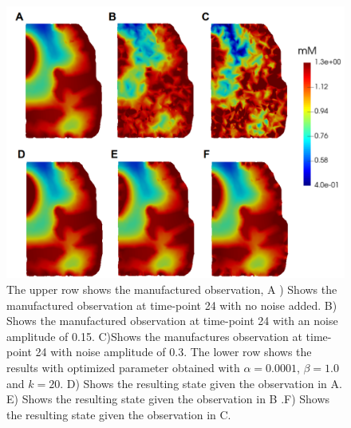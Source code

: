 \documentclass[11pt,a4paper]{article}
\begin{document}
\begin{figure}
\centering
\includegraphics[scale=0.4]{noise-12.png}  
\caption{The upper row shows the manufactured observation, A ) Shows the manufactured observation at time-point 24 with no noise added. B) Shows the manufactured observation at time-point 24 with an noise amplitude of 0.15. C)Shows the manufactures observation at time-point 24 with noise amplitude of 0.3. The lower row shows the results with optimized parameter obtained with $\alpha=0.0001$, $\beta=1.0$ and $k=20$. D) Shows the resulting state given the observation in A. E)  Shows the resulting state given the observation in B .F) Shows the resulting state given the observation in C. }
\label{12hourswithnoise}
\end{figure}
\end{document}

